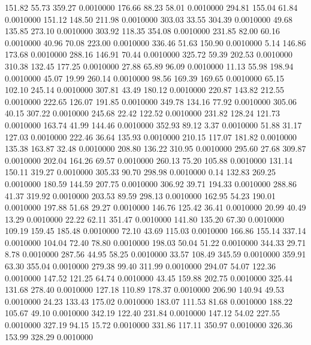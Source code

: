  151.82   55.73  359.27   0.0010000
 176.66   88.23   58.01   0.0010000
 294.81  155.04   61.84   0.0010000
 151.12  148.50  211.98   0.0010000
 303.03   33.55  304.39   0.0010000
  49.68  135.85  273.10   0.0010000
 303.92  118.35  354.08   0.0010000
 231.85   82.00   60.16   0.0010000
  40.96   70.08  223.00   0.0010000
 336.46   51.63  150.90   0.0010000
   5.14  146.86  173.68   0.0010000
 288.16  146.91   70.44   0.0010000
 325.72   59.39  202.53   0.0010000
 310.38  132.45  177.25   0.0010000
  27.88   65.89   96.09   0.0010000
  11.13   55.98  198.94   0.0010000
  45.07   19.99  260.14   0.0010000
  98.56  169.39  169.65   0.0010000
  65.15  102.10  245.14   0.0010000
 307.81   43.49  180.12   0.0010000
 220.87  143.82  212.55   0.0010000
 222.65  126.07  191.85   0.0010000
 349.78  134.16   77.92   0.0010000
 305.06   40.15  307.22   0.0010000
 245.68   22.42  122.52   0.0010000
 231.82  128.24  121.73   0.0010000
 163.74   41.99  144.46   0.0010000
 352.93   89.12    3.37   0.0010000
  51.88   31.17  127.03   0.0010000
 222.46   36.64  135.93   0.0010000
 210.15  117.07  181.82   0.0010000
 135.38  163.87   32.48   0.0010000
 208.80  136.22  310.95   0.0010000
 295.60   27.68  309.87   0.0010000
 202.04  164.26   69.57   0.0010000
 260.13   75.20  105.88   0.0010000
 131.14  150.11  319.27   0.0010000
 305.33   90.70  298.98   0.0010000
   0.14  132.83  269.25   0.0010000
 180.59  144.59  207.75   0.0010000
 306.92   39.71  194.33   0.0010000
 288.86   41.37  319.92   0.0010000
 203.53   89.59  298.13   0.0010000
 162.95   54.23  190.01   0.0010000
 197.88   51.68   29.27   0.0010000
 146.76  125.42   36.41   0.0010000
  20.99   40.49   13.29   0.0010000
  22.22   62.11  351.47   0.0010000
 141.80  135.20   67.30   0.0010000
 109.19  159.45  185.48   0.0010000
  72.10   43.69  115.03   0.0010000
 166.86  155.14  337.14   0.0010000
 104.04   72.40   78.80   0.0010000
 198.03   50.04   51.22   0.0010000
 344.33   29.71    8.78   0.0010000
 287.56   44.95   58.25   0.0010000
  33.57  108.49  345.59   0.0010000
 359.91   63.30  355.04   0.0010000
 279.38   99.40  311.99   0.0010000
 294.07   54.07  122.36   0.0010000
 147.52  121.25   64.74   0.0010000
  43.45  159.88  202.75   0.0010000
 325.44  131.68  278.40   0.0010000
 127.18  110.89  178.37   0.0010000
 206.90  140.94   49.53   0.0010000
  24.23  133.43  175.02   0.0010000
 183.07  111.53   81.68   0.0010000
 188.22  105.67   49.10   0.0010000
 342.19  122.40  231.84   0.0010000
 147.12   54.02  227.55   0.0010000
 327.19   94.15   15.72   0.0010000
 331.86  117.11  350.97   0.0010000
 326.36  153.99  328.29   0.0010000
